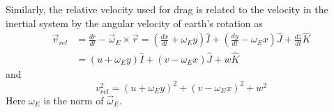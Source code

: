\documentclass[]{article}
\begin{document}
%
Similarly, the relative velocity used for drag is related to the velocity in the inertial system by the angular velocity of earth's rotation as
\begin{eqnarray}
\vec{v}_{rel} & = \frac{dr}{dt} - \vec{\omega}_E \times \vec{r} = \left(\frac{dx}{dt} + \omega_E y \right) \hat{I} + \left( \frac{dy}{dt} - \omega_E x \right) \hat{J} +  \frac{dz}{dt} \hat{K} \\
& =  \left(u + \omega_E y \right) \hat{I} + \left( v - \omega_E x \right) \hat{J} + w \hat{K} 
\end{eqnarray}
and
$$
v_{rel}^2 = (u+\omega_E y)^2 + (v - \omega_E x)^2 + w^2
$$
Here $\omega_E$ is the norm of $\vec{\omega}_E$.  
\end{document}
